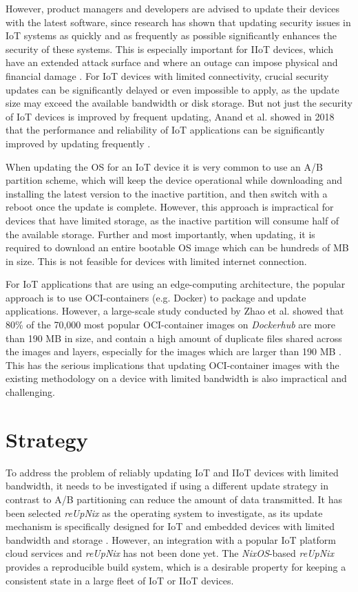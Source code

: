 However, product managers and developers are advised to update their devices with
the latest software, since
research has shown that updating security issues in \ac{IoT} systems as quickly
and as frequently as possible significantly enhances the security of these systems.
This is especially important for \ac{IIoT} devices, which have an extended attack
surface and where an outage can impose physical and financial damage \cite{s20247160}.
For \ac{IoT} devices with limited connectivity, crucial security updates can be
significantly delayed or even impossible to apply, as the update size may exceed
the available bandwidth or disk storage. But not just the security of \ac{IoT}
devices is improved by frequent updating, Anand et al. showed in 2018 that the
performance and reliability of \ac{IoT} applications can be significantly improved
by updating frequently \cite{Anand2018}.

When updating the \ac{OS} for an \ac{IoT} device it is very common to use an
A/B partition scheme, which will keep the device operational while downloading
and installing the latest version to the inactive partition, and then switch with
a reboot once the update is complete. However, this approach is impractical for
devices that have limited storage, as the inactive partition will consume
half of the available storage. Further and most importantly, when updating,
it is required to download an entire bootable \ac{OS} image which can be
hundreds of \ac{MB} in size. This is not feasible for devices with limited
internet connection.

For \ac{IoT} applications that are using an edge-computing architecture, the popular
approach is to use \ac{OCI}-containers (e.g. Docker) to package and update applications.
However, a large-scale study conducted by Zhao et al. showed that 80\% of the
70,000 most popular \ac{OCI}-container images on \textit{Dockerhub} are more than
190 \ac{MB} in size, and contain a high amount of duplicate files shared across the images
and layers, especially for the images which are larger than 190 \ac{MB} \cite{9242268}.
This has the serious implications that updating \ac{OCI}-container images with
the existing methodology on a device with limited bandwidth is also impractical
and challenging.
\clearpage

\section{Strategy}
To address the problem of reliably updating \ac{IoT} and \ac{IIoT}
devices with limited bandwidth, it needs to be investigated if using a different
update strategy in contrast to A/B partitioning can reduce the amount of data transmitted.
It has been selected \textit{reUpNix} as the operating system to investigate, as its
update mechanism is specifically designed for \ac{IoT} and embedded devices with
limited bandwidth and storage \cite{gollenstede:23:lctes}. However, an integration
with a popular \ac{IoT} platform cloud services and \textit{reUpNix} has not
been done yet. The \textit{NixOS}-based \textit{reUpNix} provides a reproducible
build system, which is a desirable property for keeping a consistent state
in a large fleet of \ac{IoT} or \ac{IIoT} devices.

